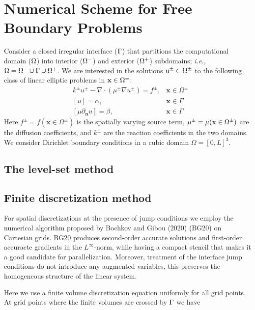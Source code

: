 \documentclass{elsarticle}
\begin{document}
\section{Numerical Scheme for Free Boundary Problems}
Consider a closed irregular interface ($\rm \Gamma$) that partitions the computational domain ($\rm \Omega$) into interior ($\rm \Omega^-$) and exterior ($\rm \Omega^+$) subdomains; \textit{i.e.}, $\rm \Omega=\Omega^- \cup \Gamma \cup \Omega^+$. We are interested in the solutions $\rm u^\pm\in \Omega^\pm$ to the following class of linear elliptic problems in  $\rm \mathbf{x}\in\Omega^\pm$:
\begin{align*}
&k^{\pm}u^{\pm} - \nabla \cdot (\mu^{\pm}\nabla u^\pm)=f^{\pm}, & \mathbf{x}\in\Omega^\pm\\
&[u]=\alpha, & \mathbf{x} \in \Gamma\\
&[\mu \partial_{\mathbf{n}}u]=\beta, & \mathbf{x} \in \Gamma
\end{align*}
Here $f^\pm=f(\mathbf{x} \in \Omega^\pm)$ is the spatially varying source term, $\rm \mu^\pm=\mu(\mathbf{x} \in \Omega^\pm)$  are the diffusion coefficients, and $k^\pm$ are the reaction coefficients in the two domains. We consider Dirichlet boundary conditions in a cubic domain $\Omega=[0,L]^3$.


\subsection{The level-set method}

\subsection{Finite discretization method}

For spatial discretizations at the presence of jump conditions we employ the numerical algorithm proposed by Bochkov and Gibou (2020) \cite{bochkov2020solving} (BG20) on Cartesian grids. BG20 produces second-order accurate solutions and first-order accuracte gradients in the $L^\infty$-norm, while having a compact stencil that makes it a good candidate for parallelization. Moreover, treatment of the interface jump conditions do not introduce any augmented variables, this preserves the homogeneous structure of the linear system. 

Here we use a finite volume discretization equation uniformly for all grid points. At grid points where the finite volumes are crossed by $\rm \Gamma$ we have
\end{document}
